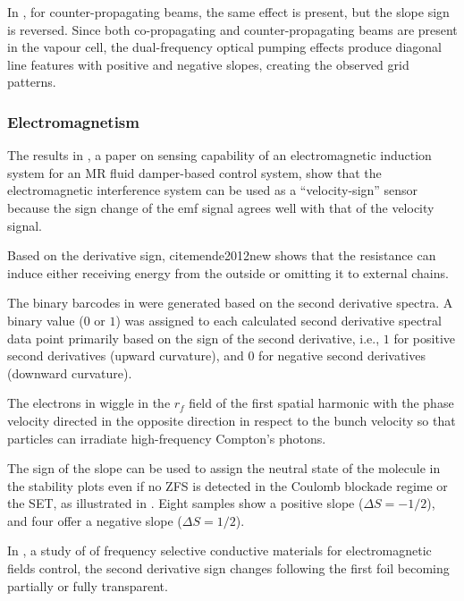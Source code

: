 \documentclass[11pt]{book}
\begin{document}
In \cite{cooper2021dual}, for counter-propagating beams, the same
effect is present, but the slope sign is reversed. Since both co-propagating
and counter-propagating beams are present in the vapour cell, the
dual-frequency optical pumping effects produce diagonal line features
with positive and negative slopes, creating the observed grid patterns.


\subsubsection{Electromagnetism}

The results in \cite{jung2009experimental}, a paper on sensing capability of an electromagnetic
induction system for an MR fluid damper-based control system, show that the electromagnetic interference system
can be used as a ``velocity-sign'' sensor because the sign change
of the emf signal agrees well with that of the velocity signal.

Based on the derivative sign, cite{mende2012new} shows that the resistance can induce either receiving energy from the outside or omitting it
to external chains.

The binary barcodes in \cite{wang2013raman} were generated based
on the second derivative spectra. A binary value ($0$ or $1$) was
assigned to each calculated second derivative spectral data point
primarily based on the sign of the second derivative, i.e., $1$ for
positive second derivatives (upward curvature), and $0$ for negative
second derivatives (downward curvature).

The electrons in \cite{kuzikov2014flying} wiggle in the $r_{f}$
field of the first spatial harmonic with the phase velocity directed
in the opposite direction in respect to the bunch velocity so that
particles can irradiate high-frequency Compton's photons.

The sign of the slope can be used to assign the neutral state of the
molecule in the stability plots even if no ZFS is detected in the
Coulomb blockade regime or the SET, as illustrated in \cite{burzuri2015observing}.
Eight samples show a positive slope ($\Delta S=-1/2$), and four offer
a negative slope ($\Delta S=1/2$).

In \cite{konoplev2020design}, a study of of frequency selective conductive materials
for electromagnetic fields control, the second derivative sign changes
following the first foil becoming partially or fully transparent.
\end{document}
